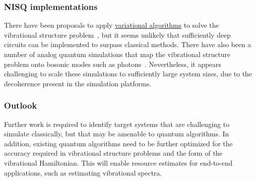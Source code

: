 \begin{refsection}
\subsubsection*{NISQ implementations}
There have been proposals to apply \hyperref[prim:VQA]{variational algorithms} to solve the vibrational structure problem~\cite{mcardle2019VibrationalSim,ollitrault2020VibrationalVQE,sawaya2020ResourceEfficientQuantumDLevel,sawaya2021NearLongTermQuantumVibrationalSpectroscopy}, but it seems unlikely that sufficiently deep circuits can be implemented to surpass classical methods. There have also been a number of analog quantum simulations that map the vibrational structure problem onto bosonic modes such as photons~\cite{sparrow2018VibrationAnalogPhotons,Huh2015VibrationBosonSampling,wang2020AnalogVibrationSuperconducting}. Nevertheless, it appears challenging to scale these simulations to sufficiently large system sizes, due to the decoherence present in the simulation platforms.



\subsubsection*{Outlook}
Further work is required to identify target systems that are challenging to simulate classically, but that may be amenable to quantum algorithms. In addition, existing quantum algorithms need to be further optimized for the accuracy required in vibrational structure problems and the form of the vibrational Hamiltonian. This will enable resource estimates for end-to-end applications, such as estimating vibrational spectra.

\printbibliography[heading=secbib,segment=\therefsegment]
\end{refsection}
\newpage












